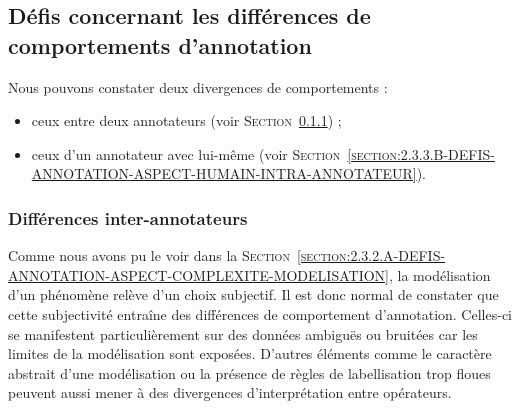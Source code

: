 		
	\subsection{Défis concernant les différences de comportements d'annotation}
	\label{section:2.3.3-DEFIS-ANNOTATION-ASPECT-HUMAIN}
		
		Nous pouvons constater deux divergences de comportements :
		\begin{itemize}
			\item ceux entre deux annotateurs (voir \textsc{Section~\ref{section:2.3.3.A-DEFIS-ANNOTATION-ASPECT-HUMAIN-INTER-ANNOTATEURS}}) ;
			\item ceux d'un annotateur avec lui-même (voir \textsc{Section~\ref{section:2.3.3.B-DEFIS-ANNOTATION-ASPECT-HUMAIN-INTRA-ANNOTATEUR}}).
		\end{itemize}
		
		
		\subsubsection{Différences inter-annotateurs}
		\label{section:2.3.3.A-DEFIS-ANNOTATION-ASPECT-HUMAIN-INTER-ANNOTATEURS}
		
			Comme nous avons pu le voir dans la \textsc{Section~\ref{section:2.3.2.A-DEFIS-ANNOTATION-ASPECT-COMPLEXITE-MODELISATION}}, la modélisation d'un phénomène relève d'un choix subjectif.
			Il est donc normal de constater que cette subjectivité entraîne des différences de comportement d'annotation.
			Celles-ci se manifestent particulièrement sur des données ambiguës ou bruitées car les limites de la modélisation sont exposées.
			D'autres éléments comme le caractère abstrait d'une modélisation ou la présence de règles de labellisation trop floues peuvent aussi mener à des divergences d'interprétation entre opérateurs.
			
